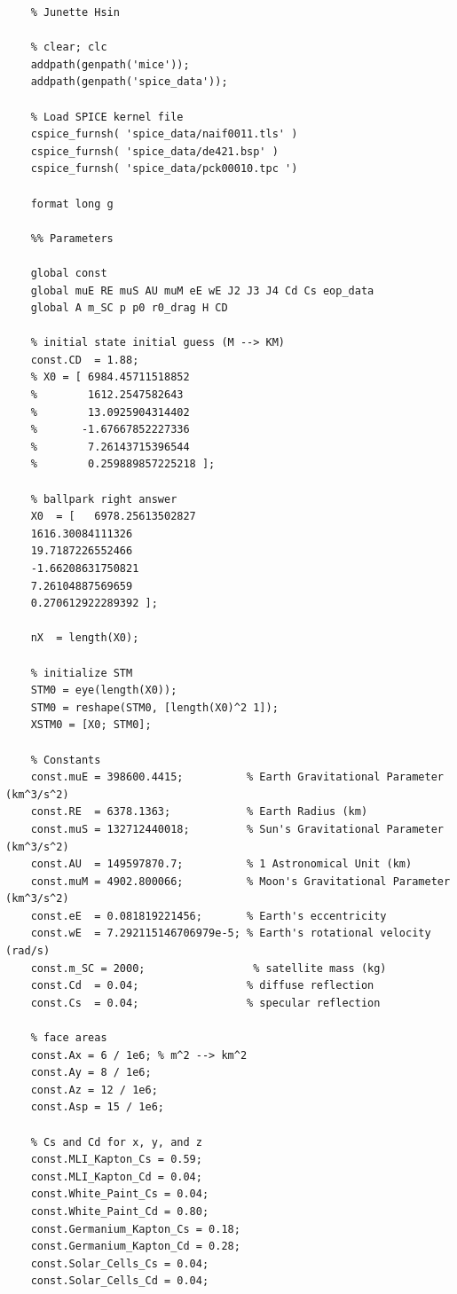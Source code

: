 \documentclass[conf]{new-aiaa}
\begin{document}
\begin{lstlisting}[basicstyle=\footnotesize]
	% HW 5 
	% Junette Hsin 
	
	% clear; clc 
	addpath(genpath('mice')); 
	addpath(genpath('spice_data')); 
	
	% Load SPICE kernel file 
	cspice_furnsh( 'spice_data/naif0011.tls' )
	cspice_furnsh( 'spice_data/de421.bsp' )       
	cspice_furnsh( 'spice_data/pck00010.tpc ') 
	
	format long g 
	
	%% Parameters 
	
	global const 
	global muE RE muS AU muM eE wE J2 J3 J4 Cd Cs eop_data 
	global A m_SC p p0 r0_drag H CD
	
	% initial state initial guess (M --> KM)
	const.CD  = 1.88;    
	% X0 = [ 6984.45711518852 
	%        1612.2547582643 
	%        13.0925904314402 
	%       -1.67667852227336
	%        7.26143715396544
	%        0.259889857225218 ]; 
	
	% ballpark right answer 
	X0  = [   6978.25613502827
	1616.30084111326
	19.7187226552466
	-1.66208631750821
	7.26104887569659
	0.270612922289392 ]; 
	
	nX  = length(X0); 
	
	% initialize STM 
	STM0 = eye(length(X0)); 
	STM0 = reshape(STM0, [length(X0)^2 1]); 
	XSTM0 = [X0; STM0];  
	
	% Constants 
	const.muE = 398600.4415;          % Earth Gravitational Parameter (km^3/s^2) 
	const.RE  = 6378.1363;            % Earth Radius (km)
	const.muS = 132712440018;         % Sun's Gravitational Parameter (km^3/s^2)
	const.AU  = 149597870.7;          % 1 Astronomical Unit (km)
	const.muM = 4902.800066;          % Moon's Gravitational Parameter (km^3/s^2)
	const.eE  = 0.081819221456;       % Earth's eccentricity 
	const.wE  = 7.292115146706979e-5; % Earth's rotational velocity (rad/s)
	const.m_SC = 2000;                 % satellite mass (kg) 
	const.Cd  = 0.04;                 % diffuse reflection 
	const.Cs  = 0.04;                 % specular reflection 
	
	% face areas 
	const.Ax = 6 / 1e6; % m^2 --> km^2 
	const.Ay = 8 / 1e6; 
	const.Az = 12 / 1e6; 
	const.Asp = 15 / 1e6; 
	
	% Cs and Cd for x, y, and z 
	const.MLI_Kapton_Cs = 0.59; 
	const.MLI_Kapton_Cd = 0.04; 
	const.White_Paint_Cs = 0.04; 
	const.White_Paint_Cd = 0.80; 
	const.Germanium_Kapton_Cs = 0.18; 
	const.Germanium_Kapton_Cd = 0.28; 
	const.Solar_Cells_Cs = 0.04; 
	const.Solar_Cells_Cd = 0.04; 
	

\end{lstlisting}
\end{document}
